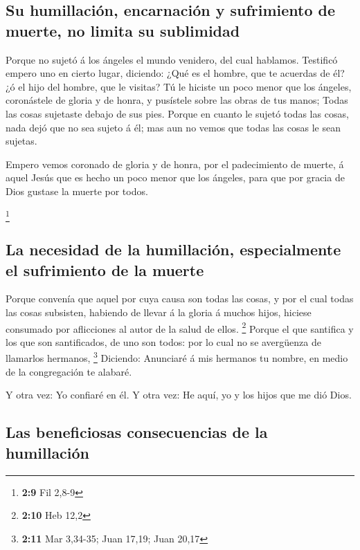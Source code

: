 \hypertarget{su-humillaciuxf3n-encarnaciuxf3n-y-sufrimiento-de-muerte-no-limita-su-sublimidad}{%
\subsection{Su humillación, encarnación y sufrimiento de muerte, no
limita su
sublimidad}\label{su-humillaciuxf3n-encarnaciuxf3n-y-sufrimiento-de-muerte-no-limita-su-sublimidad}}

 Porque no sujetó á los ángeles el mundo venidero, del cual
hablamos.  Testificó empero uno en cierto lugar, diciendo:
¿Qué es el hombre, que te acuerdas de él? ¿ó el hijo del hombre, que le
visitas?  Tú le hiciste un poco menor que los ángeles,
coronástele de gloria y de honra, y pusístele sobre las obras de tus
manos;  Todas las cosas sujetaste debajo de sus pies. Porque
en cuanto le sujetó todas las cosas, nada dejó que no sea sujeto á él;
mas aun no vemos que todas las cosas le sean sujetas.

 Empero vemos coronado de gloria y de honra, por el
padecimiento de muerte, á aquel Jesús que es hecho un poco menor que los
ángeles, para que por gracia de Dios gustase la muerte por todos.

\footnote{\textbf{2:9} Fil 2,8-9}

\hypertarget{la-necesidad-de-la-humillaciuxf3n-especialmente-el-sufrimiento-de-la-muerte}{%
\subsection{La necesidad de la humillación, especialmente el sufrimiento
de la
muerte}\label{la-necesidad-de-la-humillaciuxf3n-especialmente-el-sufrimiento-de-la-muerte}}

 Porque convenía que aquel por cuya causa son todas las
cosas, y por el cual todas las cosas subsisten, habiendo de llevar á la
gloria á muchos hijos, hiciese consumado por aflicciones al autor de la
salud de ellos. \footnote{\textbf{2:10} Heb 12,2}  Porque
el que santifica y los que son santificados, de uno son todos: por lo
cual no se avergüenza de llamarlos hermanos, \footnote{\textbf{2:11} Mar
  3,34-35; Juan 17,19; Juan 20,17}  Diciendo: Anunciaré á
mis hermanos tu nombre, en medio de la congregación te alabaré.

 Y otra vez: Yo confiaré en él. Y otra vez: He aquí, yo y
los hijos que me dió Dios.

\hypertarget{las-beneficiosas-consecuencias-de-la-humillaciuxf3n}{%
\subsection{Las beneficiosas consecuencias de la
humillación}\label{las-beneficiosas-consecuencias-de-la-humillaciuxf3n}}

